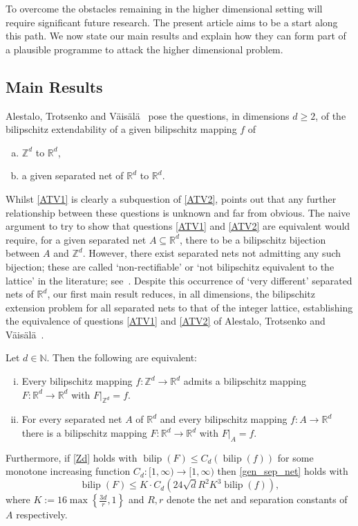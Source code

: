 \documentclass[a4paper, bibliography=totoc]{scrartcl}
\numberwithin{claimcounter}{define}
\newcommand{\R}{\mathbb{R}}
\newcommand{\Z}{\mathbb{Z}}
\newcommand{\N}{\mathbb{N}}
\newcommand{\bilip}{\operatorname{bilip}}
\newcommand{\set}[1]{\left\{#1\right\}}
\newcommand{\br}[1]{\left(#1\right)}
\begin{document}
To overcome the obstacles remaining in the higher dimensional setting will require significant future research. The present article aims to be a start along this path. We now state our main results and explain how they can form part of a plausible programme to attack the higher dimensional problem.

\subsection*{Main Results}
Alestalo, Trotsenko and V\"ais\"al\"a~\cite[4.4(ii)]{bilip_ext_sep_nets} pose the questions, in dimensions $d\geq 2$, of the bilipschitz extendability of a given bilipschitz mapping $f$ of 
\begin{enumerate}[(a)]
	\item\label{ATV1} $\Z^{d}$ to $\R^{d}$,
	\item\label{ATV2} a given separated net of $\R^{d}$ to $\R^{d}$.
\end{enumerate}
Whilst \eqref{ATV1} is clearly a subquestion of \eqref{ATV2}, \cite{bilip_ext_sep_nets} points out that any further relationship between these questions is unknown and far from obvious. The naive argument to try to show that questions \eqref{ATV1} and \eqref{ATV2} are equivalent would require, for a given separated net $A\subseteq \R^{d}$, there to be a bilipschitz bijection between $A$ and $\Z^{d}$. However, there exist separated nets not admitting any such bijection; these are called `non-rectifiable' or `not bilipschitz equivalent to the lattice' in the literature; see~\cite{BK1,McM}. Despite this occurrence of `very different' separated nets of $\R^{d}$, our first main result reduces, in all dimensions, the bilipschitz extension problem for all separated nets to that of the integer lattice, establishing the equivalence of questions \eqref{ATV1} and \eqref{ATV2} of  Alestalo, Trotsenko and V\"ais\"al\"a~\cite[4.4(ii)]{bilip_ext_sep_nets}. 
\begin{thm}\label{thm:Zd_equiv}
	Let $d\in \N$. Then the following are equivalent:
	\begin{enumerate}[(i)]
		\item\label{Zd} Every bilipschitz mapping $f\colon \Z^{d}\to \R^{d}$ admits a bilipschitz mapping $F\colon \R^{d}\to\R^{d}$ with $F|_{\Z^{d}}=f$.
		\item\label{gen_sep_net} For every separated net $A$ of $\R^{d}$ and every bilipschitz mapping $f\colon A\to \R^{d}$ there is a bilipschitz mapping $F\colon \R^{d}\to\R^{d}$ with $F|_{A}=f$.
	\end{enumerate}
	Furthermore, if \eqref{Zd} holds with $\bilip(F)\leq C_{d}\br{\bilip(f)}$ for some monotone increasing function $C_{d}\colon [1,\infty)\to [1,\infty)$ then \eqref{gen_sep_net} holds with
	\begin{equation*}
	\bilip(F)\leq K\cdot C_{d}\br{24\sqrt{d}R^{2}K^{3}\bilip(f)},
	\end{equation*}
	where $K:= 16\max\set{\frac{3d}{r},1}$ and $R, r$ denote the net and separation constants of $A$ respectively. 
\end{thm}
\end{document}
